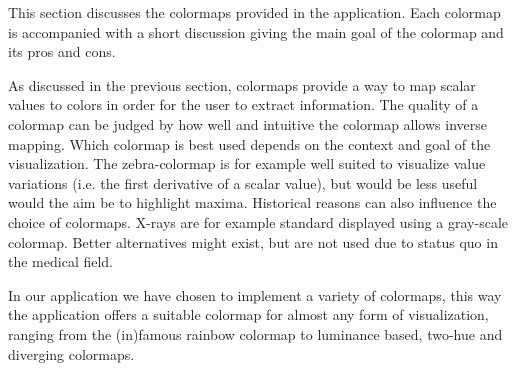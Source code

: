 This section discusses the colormaps provided in the application. Each colormap is accompanied with a short discussion giving the main goal of the colormap and its pros and cons.

As discussed in the previous section, colormaps provide a way to map scalar values to colors in order for the user to extract information. The quality of a colormap can be judged by how well and intuitive the colormap allows inverse mapping. Which colormap is best used depends on the context and goal of the visualization. The zebra-colormap is for example well suited to visualize value variations (i.e. the first derivative of a scalar value), but would be less useful would the aim be to highlight maxima. Historical reasons can also influence the choice of colormaps. X-rays are for example standard displayed using a gray-scale colormap. Better alternatives might exist, but are not used due to status quo in the medical field.

In our application we have chosen to implement a variety of colormaps, this way the application offers a suitable colormap for almost any form of visualization, ranging from the (in)famous rainbow colormap to luminance based, two-hue and diverging colormaps.

